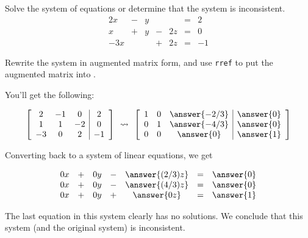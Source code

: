 \documentclass{ximera}
\begin{document}
\begin{example}\label{ex:nosolutionssys}
Solve the system of equations or determine that the system is inconsistent.
$$\begin{array}{ccccccc}
      2x & -&y&&&= &2 \\
     x& +&y&-&2z&=&0\\
     -3x& &&+&2z&=&-1
    \end{array}$$
     
    \begin{explanation}
    Rewrite the system in augmented matrix form, and use \texttt{rref} to put the augmented matrix into \rref.

    You'll get the following:
     
   \begin{equation}\label{eq:sys20nosolutionsys} \left[\begin{array}{ccc|c} 
 2&-1&0&2\\1&1&-2&0\\-3&0&2&-1
 \end{array}\right]\begin{array}{c}
 \\
 \rightsquigarrow\\
 \\
 \end{array}\left[\begin{array}{ccc|c} 
 1&0&\answer{-2/3}&\answer{0}\\0&1&\answer{-4/3}&\answer{0}\\0&0&\answer{0}&\answer{1}
 \end{array}\right]\end{equation}
     
 Converting back to a system of linear equations, we get
  
 \begin{equation}\label{eq:sys20nosolutions}\begin{array}{ccccccc}
      0x &+ &0y&-&\answer{(2/3)z}&= &\answer{0} \\
     0x&+ &0y&-&\answer{(4/3)z}&=&\answer{0}\\
     0x&+ &0y&+&\answer{0z}&=&\answer{1}
    \end{array}\end{equation}

    The last equation in this system clearly has no solutions.  We conclude that this system (and the original system) is inconsistent.

    \end{explanation}
     
\end{example}
 
\end{document}
